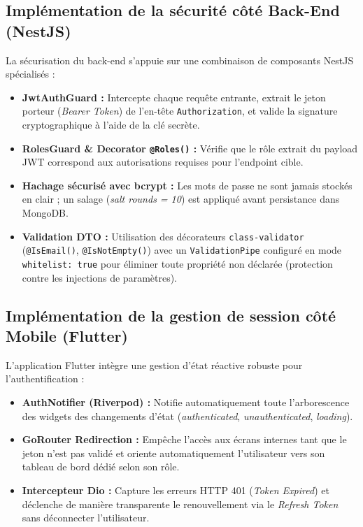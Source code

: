 \subsection{Impl\'ementation de la s\'ecurit\'e c\^ot\'e Back-End (NestJS)}
La s\'ecurisation du back-end s'appuie sur une combinaison de composants NestJS sp\'ecialis\'es :
\begin{itemize}
    \item \textbf{JwtAuthGuard :} Intercepte chaque requ\^ete entrante, extrait le jeton porteur (\textit{Bearer Token}) de l'en-t\^ete \texttt{Authorization}, et valide la signature cryptographique \`a l'aide de la cl\'e secr\`ete.
    \item \textbf{RolesGuard \& Decorator \texttt{@Roles()} :} V\'erifie que le r\^ole extrait du payload JWT correspond aux autorisations requises pour l'endpoint cible.
    \item \textbf{Hachage s\'ecuris\'e avec bcrypt :} Les mots de passe ne sont jamais stock\'es en clair ; un salage (\textit{salt rounds = 10}) est appliqu\'e avant persistance dans MongoDB.
    \item \textbf{Validation DTO :} Utilisation des d\'ecorateurs \texttt{class-validator} (\texttt{@IsEmail()}, \texttt{@IsNotEmpty()}) avec un \texttt{ValidationPipe} configur\'e en mode \texttt{whitelist: true} pour \'eliminer toute propri\'et\'e non d\'eclar\'ee (protection contre les injections de param\`etres).
\end{itemize}

\subsection{Impl\'ementation de la gestion de session c\^ot\'e Mobile (Flutter)}
L'application Flutter int\`egre une gestion d'\'etat r\'eactive robuste pour l'authentification :
\begin{itemize}
    \item \textbf{AuthNotifier (Riverpod) :} Notifie automatiquement toute l'arborescence des widgets des changements d'\'etat (\textit{authenticated}, \textit{unauthenticated}, \textit{loading}).
    \item \textbf{GoRouter Redirection :} Emp\^eche l'acc\`es aux \'ecrans internes tant que le jeton n'est pas valid\'e et oriente automatiquement l'utilisateur vers son tableau de bord d\'edi\'e selon son r\^ole.
    \item \textbf{Intercepteur Dio :} Capture les erreurs HTTP 401 (\textit{Token Expired}) et d\'eclenche de mani\`ere transparente le renouvellement via le \textit{Refresh Token} sans d\'econnecter l'utilisateur.
\end{itemize}

